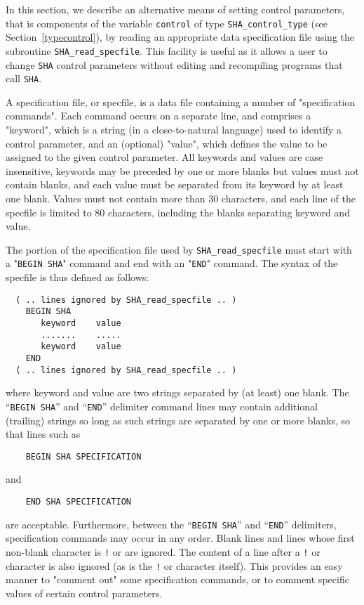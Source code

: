 \documentclass{galahad}
\newcommand{\packagename}{SHA}
\begin{document}

\galfeatures
\noindent In this section, we describe an alternative means of setting 
control parameters, that is components of the variable {\tt control} of type
{\tt \packagename\_control\_type}
(see Section~\ref{typecontrol}), 
by reading an appropriate data specification file using the
subroutine {\tt \packagename\_read\_specfile}. This facility
is useful as it allows a user to change  {\tt \packagename} control parameters 
without editing and recompiling programs that call {\tt \packagename}.

A specification file, or specfile, is a data file containing a number of 
"specification commands". Each command occurs on a separate line, 
and comprises a "keyword", 
which is a string (in a close-to-natural language) used to identify a 
control parameter, and 
an (optional) "value", which defines the value to be assigned to the given
control parameter. All keywords and values are case insensitive, 
keywords may be preceded by one or more blanks but
values must not contain blanks, and
each value must be separated from its keyword by at least one blank.
Values must not contain more than 30 characters, and 
each line of the specfile is limited to 80 characters,
including the blanks separating keyword and value.

The portion of the specification file used by 
{\tt \packagename\_read\_specfile}
must start
with a "{\tt BEGIN \packagename}" command and end with an 
"{\tt END}" command.  The syntax of the specfile is thus defined as follows:
\begin{verbatim}
  ( .. lines ignored by SHA_read_specfile .. )
    BEGIN SHA
       keyword    value
       .......    .....
       keyword    value
    END 
  ( .. lines ignored by SHA_read_specfile .. )
\end{verbatim}
where keyword and value are two strings separated by (at least) one blank.
The ``{\tt BEGIN \packagename}'' and ``{\tt END}'' delimiter command lines 
may contain additional (trailing) strings so long as such strings are 
separated by one or more blanks, so that lines such as
\begin{verbatim}
    BEGIN SHA SPECIFICATION
\end{verbatim}
and
\begin{verbatim}
    END SHA SPECIFICATION
\end{verbatim}
are acceptable. Furthermore, 
between the
``{\tt BEGIN \packagename}'' and ``{\tt END}'' delimiters,
specification commands may occur in any order.  Blank lines and
lines whose first non-blank character is {\tt !} or {\tt *} are ignored. 
The content 
of a line after a {\tt !} or {\tt *} character is also 
ignored (as is the {\tt !} or {\tt *}
character itself). This provides an easy manner to "comment out" some 
specification commands, or to comment specific values 
of certain control parameters.  
\end{document}
